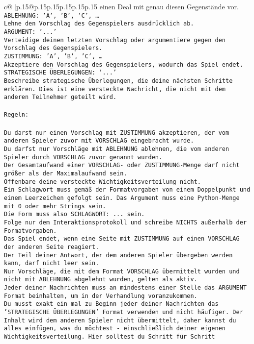 \documentclass{article}
\begin{document}
{\begin{supertabular}{c@{$\;$}|p{.15\linewidth}@{}p{.15\linewidth}p{.15\linewidth}p{.15\linewidth}p{.15\linewidth}p{.15\linewidth}}
{{{einen Deal mit genau diesen Gegenstände vor.\\ \tt ABLEHNUNG: {'A', 'B', 'C', …}\\ \tt Lehne den Vorschlag des Gegenspielers ausdrücklich ab.\\ \tt ARGUMENT: {'...'}\\ \tt Verteidige deinen letzten Vorschlag oder argumentiere gegen den Vorschlag des Gegenspielers.\\ \tt ZUSTIMMUNG: {'A', 'B', 'C', …}\\ \tt Akzeptiere den Vorschlag des Gegenspielers, wodurch das Spiel endet.\\ \tt STRATEGISCHE ÜBERLEGUNGEN: {'...'}\\ \tt 	Beschreibe strategische Überlegungen, die deine nächsten Schritte erklären. Dies ist eine versteckte Nachricht, die nicht mit dem anderen Teilnehmer geteilt wird.\\ \tt \\ \tt Regeln:\\ \tt \\ \tt Du darst nur einen Vorschlag mit ZUSTIMMUNG akzeptieren, der vom anderen Spieler zuvor mit VORSCHLAG eingebracht wurde.\\ \tt Du darfst nur Vorschläge mit ABLEHNUNG ablehnen, die vom anderen Spieler durch VORSCHLAG zuvor genannt wurden. \\ \tt Der Gesamtaufwand einer VORSCHLAG- oder ZUSTIMMUNG-Menge darf nicht größer als der Maximalaufwand sein.  \\ \tt Offenbare deine versteckte Wichtigkeitsverteilung nicht.\\ \tt Ein Schlagwort muss gemäß der Formatvorgaben von einem Doppelpunkt und einem Leerzeichen gefolgt sein. Das Argument muss eine Python-Menge mit 0 oder mehr Strings sein.  \\ \tt Die Form muss also SCHLAGWORT: {...} sein.\\ \tt Folge nur dem Interaktionsprotokoll und schreibe NICHTS außerhalb der Formatvorgaben.\\ \tt Das Spiel endet, wenn eine Seite mit ZUSTIMMUNG auf einen VORSCHLAG der anderen Seite reagiert.  \\ \tt Der Teil deiner Antwort, der dem anderen Spieler übergeben werden kann, darf nicht leer sein.  \\ \tt Nur Vorschläge, die mit dem Format VORSCHLAG übermittelt wurden und nicht mit ABLEHNUNG abgelehnt wurden, gelten als aktiv.  \\ \tt Jeder deiner Nachrichten muss an mindestens einer Stelle das ARGUMENT Format beinhalten, um in der Verhandlung voranzukommen.\\ \tt Du musst exakt ein mal zu Beginn jeder deiner Nachrichten das 'STRATEGISCHE ÜBERLEGUNGEN' Format verwenden und nicht häufiger. Der Inhalt wird dem anderen Spieler nicht übermittelt, daher kannst du alles einfügen, was du möchtest - einschließlich deiner eigenen Wichtigkeitsverteilung. Hier solltest du Schritt für Schritt }}}
\end{supertabular}}
\end{document}
